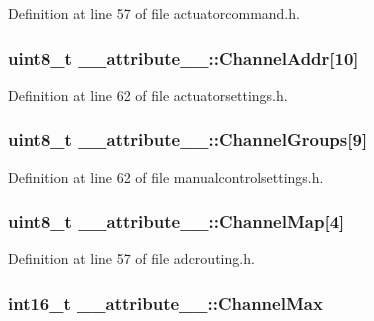 \-Definition at line 57 of file actuatorcommand.\-h.

\hypertarget{struct____attribute_____a8edfa0abebe61725ea8c7f241a7c93d2}{
\subsubsection[{\-Channel\-Addr}]{\setlength{\rightskip}{0pt plus 5cm}uint8\-\_\-t {\bf \-\_\-\-\_\-attribute\-\_\-\-\_\-\-::\-Channel\-Addr}\mbox{[}10\mbox{]}}}\label{struct____attribute_____a8edfa0abebe61725ea8c7f241a7c93d2}


\-Definition at line 62 of file actuatorsettings.\-h.

\hypertarget{struct____attribute_____ae49af57461bb199c8cbe21ef4dfc07ab}{
\subsubsection[{\-Channel\-Groups}]{\setlength{\rightskip}{0pt plus 5cm}uint8\-\_\-t {\bf \-\_\-\-\_\-attribute\-\_\-\-\_\-\-::\-Channel\-Groups}\mbox{[}9\mbox{]}}}\label{struct____attribute_____ae49af57461bb199c8cbe21ef4dfc07ab}


\-Definition at line 62 of file manualcontrolsettings.\-h.

\hypertarget{struct____attribute_____afe1e54771a83e7d240837b50a540a35e}{
\subsubsection[{\-Channel\-Map}]{\setlength{\rightskip}{0pt plus 5cm}uint8\-\_\-t {\bf \-\_\-\-\_\-attribute\-\_\-\-\_\-\-::\-Channel\-Map}\mbox{[}4\mbox{]}}}\label{struct____attribute_____afe1e54771a83e7d240837b50a540a35e}


\-Definition at line 57 of file adcrouting.\-h.

\hypertarget{struct____attribute_____aeb09cf04435444e23c55bbf1f6ffe7f2}{
\subsubsection[{\-Channel\-Max}]{\setlength{\rightskip}{0pt plus 5cm}int16\-\_\-t {\bf \-\_\-\-\_\-attribute\-\_\-\-\_\-\-::\-Channel\-Max}}}\label{struct____attribute_____aeb09cf04435444e23c55bbf1f6ffe7f2}


